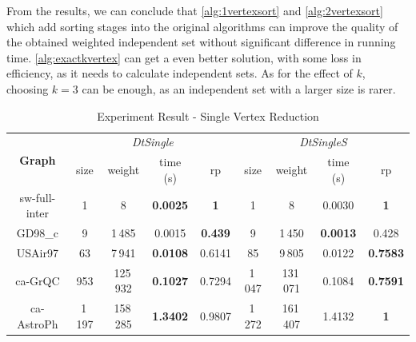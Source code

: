 \documentclass[sigconf, nonacm]{acmart}
\begin{document}
From the results, we can conclude that \autoref{alg:1vertexsort} and \autoref{alg:2vertexsort} which add sorting stages into the original algorithms can improve the quality of the obtained weighted independent set without significant difference in running time. \autoref{alg:exactkvertex} can get a even better solution, with some loss in efficiency, as it needs to calculate independent sets. As for the effect of $k$, choosing $k=3$ can be enough, as an independent set with a larger size is rarer.


\begin{table}[htbp]
\caption{Experiment Result - Single Vertex Reduction}
\label{tab:experimentsingle}
\begin{tabular}{c|cccc|cccc}
\hline
\multirow{2}{*}{\textbf{Graph}} & \multicolumn{4}{c|}{\textit{DtSingle}} & \multicolumn{4}{c}{\textit{DtSingleS}} \\ \cline{2-9} 
              & size    & weight      & time (s)           & rp             & size    & weight      & time (s)           & rp              \\ \hline
sw-full-inter & 1    & 8      & \textbf{0.0025} & \textbf{1}     & 1    & 8      & 0.0030          & \textbf{1}      \\
GD98\_c       & 9    & 1\,485   & 0.0015          & \textbf{0.439} & 9    & 1\,450   & \textbf{0.0013} & 0.428           \\
USAir97       & 63   & 7\,941   & \textbf{0.0108} & 0.6141         & 85   & 9\,805   & 0.0122          & \textbf{0.7583} \\
ca-GrQC       & 953  & 125\,932 & \textbf{0.1027} & 0.7294         & 1\,047 & 131\,071 & 0.1084          & \textbf{0.7591} \\
ca-AstroPh    & 1\,197 & 158\,285 & \textbf{1.3402} & 0.9807         & 1\,272 & 161\,407 & 1.4132          & \textbf{1}      \\ \hline
\end{tabular}
\end{table}
\end{document}
